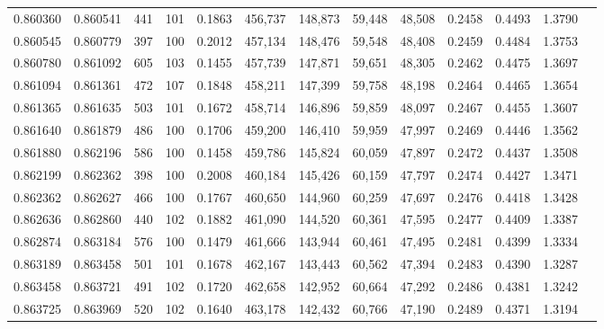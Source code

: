 \begin{tabular}{rrrrrrrrrrrrr}
0.860360 & 0.860541 &   441 & 101 &                                     0.1863 & 456,737 & 148,873 &  59,448 &  48,508 & 0.2458 & 0.4493 & 1.3790 \\
0.860545 & 0.860779 &   397 & 100 &                                     0.2012 & 457,134 & 148,476 &  59,548 &  48,408 & 0.2459 & 0.4484 & 1.3753 \\
0.860780 & 0.861092 &   605 & 103 &                                     0.1455 & 457,739 & 147,871 &  59,651 &  48,305 & 0.2462 & 0.4475 & 1.3697 \\
0.861094 & 0.861361 &   472 & 107 &                                     0.1848 & 458,211 & 147,399 &  59,758 &  48,198 & 0.2464 & 0.4465 & 1.3654 \\
0.861365 & 0.861635 &   503 & 101 &                                     0.1672 & 458,714 & 146,896 &  59,859 &  48,097 & 0.2467 & 0.4455 & 1.3607 \\
0.861640 & 0.861879 &   486 & 100 &                                     0.1706 & 459,200 & 146,410 &  59,959 &  47,997 & 0.2469 & 0.4446 & 1.3562 \\
0.861880 & 0.862196 &   586 & 100 &                                     0.1458 & 459,786 & 145,824 &  60,059 &  47,897 & 0.2472 & 0.4437 & 1.3508 \\
0.862199 & 0.862362 &   398 & 100 &                                     0.2008 & 460,184 & 145,426 &  60,159 &  47,797 & 0.2474 & 0.4427 & 1.3471 \\
0.862362 & 0.862627 &   466 & 100 &                                     0.1767 & 460,650 & 144,960 &  60,259 &  47,697 & 0.2476 & 0.4418 & 1.3428 \\
0.862636 & 0.862860 &   440 & 102 &                                     0.1882 & 461,090 & 144,520 &  60,361 &  47,595 & 0.2477 & 0.4409 & 1.3387 \\
0.862874 & 0.863184 &   576 & 100 &                                     0.1479 & 461,666 & 143,944 &  60,461 &  47,495 & 0.2481 & 0.4399 & 1.3334 \\
0.863189 & 0.863458 &   501 & 101 &                                     0.1678 & 462,167 & 143,443 &  60,562 &  47,394 & 0.2483 & 0.4390 & 1.3287 \\
0.863458 & 0.863721 &   491 & 102 &                                     0.1720 & 462,658 & 142,952 &  60,664 &  47,292 & 0.2486 & 0.4381 & 1.3242 \\
0.863725 & 0.863969 &   520 & 102 &                                     0.1640 & 463,178 & 142,432 &  60,766 &  47,190 & 0.2489 & 0.4371 & 1.3194 \\

\end{tabular}
